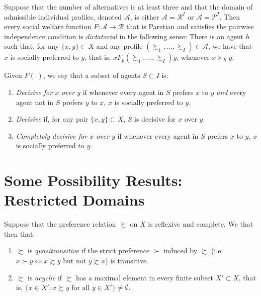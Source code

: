 \begin{prop}
    Suppose that the number of alternatives is at least three and that the domain of admissible individual profiles, denoted $\mathscr{A}$, is either $\mathscr{A} = \mathscr{R}^I$ or $\mathscr{A} = \mathscr{P}^I$. Then every social welfare function $F : \mathscr{A} \to \mathscr{R}$ that is Paretian and satisfies the pairwise independence condition is \emph{dictatorial} in the following sense: There is an agent $h$ such that, for any $\{x, y\} \subset X$ and any profile $(\succsim_1, \dots, \succsim_I) \in \mathscr{A}$, we have that $x$ is socially preferred to $y$, that is, $x F_p (\succsim_1, \dots, \succsim_I) y$, whenever $x \succ_h y$.
\end{prop}

\begin{defn}
    Given $F(\cdot)$, we say that a subset of agents $S \subset I$ is:
    \begin{enumerate}
        \item \emph{Decisive for $x$ over $y$} if whenever every agent in $S$ prefers $x$ to $y$ \emph{and} every agent not in $S$ prefers $y$ to $x$, $x$ is socially preferred to $y$.
        \item \emph{Decisive} if, for any pair $\{x, y\} \subset X$, $S$ is decisive for $x$ over $y$.
        \item \emph{Completely decisive for $x$ over $y$} if whenever every agent in $S$ prefers $x$ to $y$, $x$ is socially preferred to $y$.
    \end{enumerate}
\end{defn}


\section{Some Possibility Results: Restricted Domains}

\begin{defn}
    Suppose that the preference relation $\succsim$ on $X$ is reflexive and complete. We that then that:
    \begin{enumerate}
        \item $\succsim$ is \emph{quasitransitive} if the strict preference $\succ$ induced by $\succsim$ (i.e. $x \succ y \iff x \succsim y$ but not $y \succsim x$) is transitive.
        \item $\succsim$ is \emph{acyclic} if $\succsim$ has a maximal element in every finite subset $X' \subset X$, that is, $\{x \in X' : x \succsim y \text{ for all } y \in X'\} \neq \emptyset$.
    \end{enumerate}
\end{defn}

